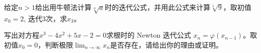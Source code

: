 \documentclass[11pt]{article}
\begin{document}
\maketitle

\thispagestyle{empty}

\newpage

\begin{question}

    \questiontext
    {
        给定$n > 1$给出用牛顿法计算$\sqrt[n]{a}$时的迭代公式，并用此公式来计算$\sqrt[5]{9}$，取初值$x_0 = 2$, 迭代3次，求$x_3$。
    }

    \answer
    {

    }

\end{question}

\begin{question}

    \questiontext
    {
        写出对方程$x^3 - 4x^2 + 5x - 2 =0$求根时的 Newton 迭代公式 $x_n = \varphi(x_{n - 1})$。取初值$x_0 = 0$，判断极限$\displaystyle \lim_{n \rightarrow \infty}{x_n}$是否存在，请给出你的理由或证明。
    }

    \answer
    {

    }

\end{question}
\end{document}
